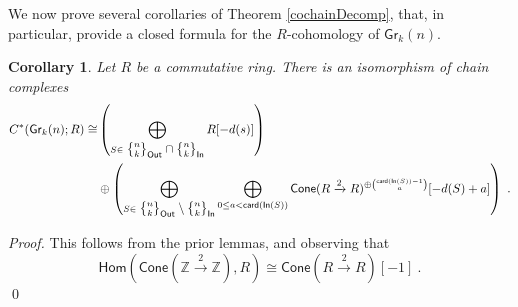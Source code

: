 \documentclass{article}
\newcommand{\bb}[1]{\mathbb{#1}}
\newcommand{\msf}[1]{\mathsf{#1}}
\newcommand{\gr}{\msf{Gr}}
\newcommand{\nchoosek}{\textstyle\genfrac{\lbrace}{\rbrace}{0pt}{}}
\newcommand{\card}{\msf{card}}
\newcommand{\cone}{\msf{Cone}}
\newcommand{\In}{\msf{In}}
\newcommand{\Out}{\msf{Out}}
\newtheorem{corollary}[theorem]{Corollary}
\theoremstyle{definition}
\begin{document}
We now prove several corollaries of Theorem \ref{cochainDecomp}, that, in particular, 
provide a closed formula for the $R$-cohomology of $\gr_k(n)$.

\begin{corollary}\label{cochains}
    Let $R$ be a commutative ring. There is an isomorphism of chain complexes
    \begin{align*}
        C^*(\gr_k(n);R) \cong &\left(\bigoplus_{S \in \nchoosek{n}{k}_\Out \cap \nchoosek{n}{k}_\In} R[-d(s)]\right) \\
        &\oplus
        \left(\bigoplus_{S \in \nchoosek{n}{k}_\Out \setminus \nchoosek{n}{k}_\In} 
        \bigoplus_{0 \le a<\card(\In(S))} \cone(R\xrightarrow{2}R)^{\oplus{\card(\In(S))-1 \choose a}}[-d(S)+a]\right)~.
    \end{align*}
\end{corollary}
{\it Proof.}
This follows from the prior lemmas, and observing that 
$$\msf{Hom}(\cone(\bb{Z}\xrightarrow{2}\bb{Z}),R) \cong \cone(R\xrightarrow{2}R)[-1]~.$$
\qed \\
\end{document}
